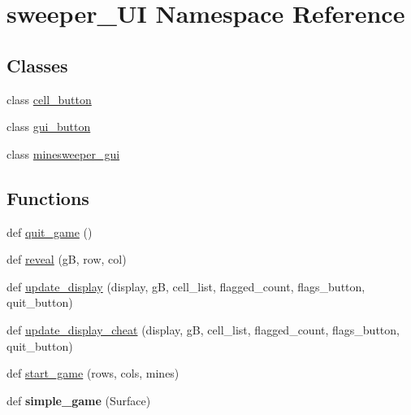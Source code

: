\hypertarget{namespacesweeper___u_i}{}\section{sweeper\+\_\+\+UI Namespace Reference}
\label{namespacesweeper___u_i}
\subsection*{Classes}
\begin{DoxyCompactItemize}
\item 
class \mbox{\hyperlink{classsweeper___u_i_1_1cell__button}{cell\+\_\+button}}
\item 
class \mbox{\hyperlink{classsweeper___u_i_1_1gui__button}{gui\+\_\+button}}
\item 
class \mbox{\hyperlink{classsweeper___u_i_1_1minesweeper__gui}{minesweeper\+\_\+gui}}
\end{DoxyCompactItemize}
\subsection*{Functions}
\begin{DoxyCompactItemize}
\item 
def \mbox{\hyperlink{namespacesweeper___u_i_a60d3b69c6e596a8cc72c88a3fd159926}{quit\+\_\+game}} ()
\item 
def \mbox{\hyperlink{namespacesweeper___u_i_a1d2372a72b38f4c14cfd981325b3ee83}{reveal}} (gB, row, col)
\item 
def \mbox{\hyperlink{namespacesweeper___u_i_ac5f95a0e13b131052e1fbe163a142ff5}{update\+\_\+display}} (display, gB, cell\+\_\+list, flagged\+\_\+count, flags\+\_\+button, quit\+\_\+button)
\item 
def \mbox{\hyperlink{namespacesweeper___u_i_a892a833cb13683da856095b3f50e5d0c}{update\+\_\+display\+\_\+cheat}} (display, gB, cell\+\_\+list, flagged\+\_\+count, flags\+\_\+button, quit\+\_\+button)
\item 
def \mbox{\hyperlink{namespacesweeper___u_i_a6d328451ee39123c0cb2af67b6a79379}{start\+\_\+game}} (rows, cols, mines)
\item 
\mbox{\label{namespacesweeper___u_i_ab27d6803daa643375e2d14d431a86198}} 
def {\bfseries simple\+\_\+game} (Surface)
\end{DoxyCompactItemize}
